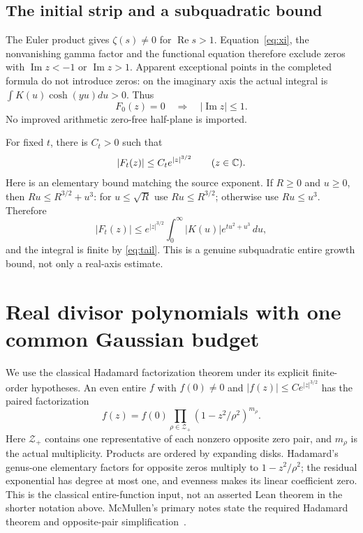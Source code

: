\documentclass[11pt]{article}
\begin{document}
\subsection*{The initial strip and a subquadratic bound}
The Euler product gives $\zeta(s)\ne0$ for $\operatorname{Re}s>1$.
Equation~\eqref{eq:xi}, the nonvanishing gamma factor and the functional
equation therefore exclude zeros with $\operatorname{Im}z<-1$ or
$\operatorname{Im}z>1$. Apparent exceptional points in the completed
formula do not introduce zeros: on the imaginary axis the actual integral
is $\int K(u)\cosh(yu)du>0$.
Thus
\begin{equation}\label{eq:initialstrip}
 F_0(z)=0\quad\Longrightarrow\quad |\operatorname{Im}z|\le1.
\end{equation}
No improved arithmetic zero-free half-plane is imported.

For fixed $t$, there is $C_t>0$ such that
\begin{equation}\label{eq:growth}
 |F_t(z)|\le C_t e^{|z|^{3/2}}\qquad(z\in\mathbb C).
\end{equation}
Here is an elementary bound matching the source exponent. If $R\ge0$
and $u\ge0$, then $Ru\le R^{3/2}+u^3$: for $u\le\sqrt R$ use
$Ru\le R^{3/2}$; otherwise use $Ru\le u^3$. Therefore
\[
 |F_t(z)|\le e^{|z|^{3/2}}\int_0^\infty
                      |K(u)|e^{tu^2+u^3}\,du,
\]
and the integral is finite by \eqref{eq:tail}. This is a genuine
subquadratic entire growth bound, not only a real-axis estimate.

\section{Real divisor polynomials with one common Gaussian budget}
We use the classical Hadamard factorization theorem under its explicit
finite-order hypotheses. An even entire $f$ with $f(0)\ne0$ and
$|f(z)|\le C e^{|z|^{3/2}}$ has the paired factorization
\begin{equation}\label{eq:product}
 f(z)=f(0)\prod_{\rho\in\mathcal Z_+}
                (1-z^2/\rho^2)^{m_\rho}.
\end{equation}
Here $\mathcal Z_+$ contains one representative of each nonzero opposite
zero pair, and $m_\rho$ is the actual multiplicity. Products are ordered
by expanding disks. Hadamard's genus-one elementary factors for opposite
zeros multiply to $1-z^2/\rho^2$; the residual exponential has degree at
most one, and evenness makes its linear coefficient zero. This is the
classical entire-function input, not an asserted Lean theorem in the
shorter notation above. McMullen's primary notes state the required
Hadamard theorem and opposite-pair simplification~\cite{McMullen}.
\end{document}
